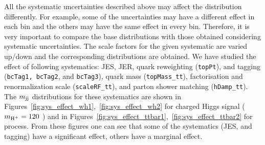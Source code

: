 
All the systematic uncertainties described above may affect the \mjj distribution differently.
For example, some of the uncertainties may have a different effect in each bin and the others
may have the same effect in every bin. Therefore, it is very important to compare the base \mjj
distributions with those obtained considering systematic uncertainties. The scale factors for the 
given systematic are varied up/down and the corresponding \mjj distributions are obtained. We have 
studied the effect 
of following systematics: JES, JER, \PQt quark \pt reweighting (\verb|topPt|), \PQb and \PQc tagging 
(\verb|bcTag1, bcTag2|, and \verb|bcTag3|), \PQt quark mass
(\verb|topMass_tt|), factorisation and renormalization scale (\verb|scaleRF_tt|), and parton shower matching (\verb|hDamp_tt|). The $m_\text{jj}$ distributions for 
these systematics are shown in Figures~\ref{fig:sys_effect_wh1},~\ref{fig:sys_effect_wh2} for charged 
Higgs signal ($m_{\text{H}^+} = 120$ \GeV) and in 
Figures~\ref{fig:sys_effect_ttbar1},~\ref{fig:sys_effect_ttbar2} for \ttjets process. From these 
figures one can see that some of the systematics (JES, \PQb and \PQc tagging) have  a significant 
effect, others have a marginal effect.

